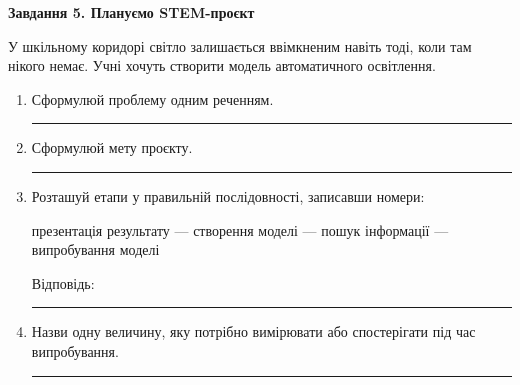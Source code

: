 \documentclass[10pt,a4paper]{article}
\newcommand{\answerline}[1]{\par\vspace{2pt}\rule{#1}{0.4pt}}
\begin{document}
\textbf{Завдання 5. Плануємо STEM-проєкт}

У шкільному коридорі світло залишається ввімкненим навіть тоді, коли там нікого немає. Учні хочуть створити модель автоматичного освітлення.

\begin{enumerate}[label=\alph*)]
  \item Сформулюй проблему одним реченням.
  \answerline{\linewidth}
  \item Сформулюй мету проєкту.
  \answerline{\linewidth}
  \item Розташуй етапи у правильній послідовності, записавши номери:

  \begin{center}
  презентація результату --- створення моделі --- пошук інформації --- випробування моделі
  \end{center}
  Відповідь: \rule{6cm}{0.4pt}
  \item Назви одну величину, яку потрібно вимірювати або спостерігати під час випробування.
  \answerline{\linewidth}
\end{enumerate}
\end{document}
